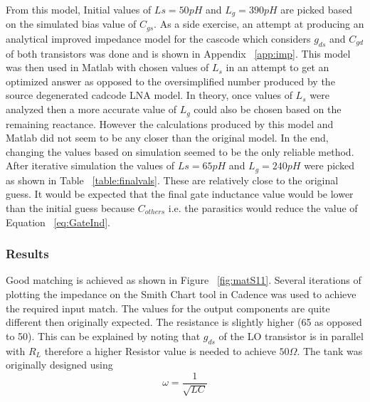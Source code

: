 \documentclass{article}                                                         %
\begin{document}
From this model, Initial values of $Ls = 50pH$ and $L_g = 390pH$ are picked based on the simulated bias value of $C_{gs}$.
As a side exercise, an attempt at producing an analytical improved impedance model for the cascode which considers $g_{ds}$
and $C_{gd}$ of both transistors was done and is shown in Appendix ~\ref{app:imp}.
This model was then used in Matlab with chosen values of $L_s$ in an attempt to get an optimized answer as opposed to the oversimplified number produced
by the source degenerated cadcode LNA model. In theory, once values of $L_s$ were analyzed then a more accurate value of $L_g$ could
also be chosen based on the remaining reactance. However the calculations produced by this model and Matlab did not seem to be any closer
than the original model. In the end, changing the values based on simulation seemed to be the only reliable method.\\

After iterative simulation the values of $Ls = 65pH$ and $L_g = 240pH$ were picked as shown in Table ~\ref{table:finalvals}.
These are relatively close to the original guess. It would be expected that the final gate inductance value would be lower than
the initial guess because $C_{others}$ i.e. the parasitics would reduce the value of Equation ~\ref{eq:GateInd}.

\subsubsection{Results}
Good matching is achieved as shown in Figure ~\ref{fig:matS11}. Several iterations of plotting the impedance on the Smith Chart tool
in Cadence was used to achieve the required input match. The values for the output components are quite different then originally expected. The resistance is
slightly higher (65 as opposed to 50). This can be explained by noting that $g_{ds}$ of the LO transistor is in parallel with $R_L$ therefore a
higher Resistor value is needed to achieve $50 \Omega$. The tank was originally designed using
$$ \omega = \dfrac{1}{\sqrt{LC}}$$
\end{document}
